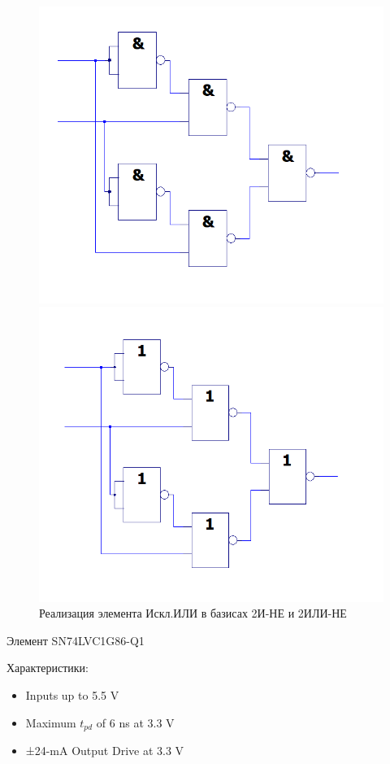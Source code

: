 \begin{figure}[H]
	\centering
	\begin{minipage}{.45\textwidth}
		\centering
		\includegraphics[width=0.85\linewidth]{imgs/1/xor_and}
	\end{minipage}
	\begin{minipage}{.45\textwidth}
		\centering
		\includegraphics[width=0.85\linewidth]{imgs/1/xor_or}
	\end{minipage}
	\caption{Реализация элемента Искл.ИЛИ в базисах 2И-НЕ и 2ИЛИ-НЕ}
\end{figure}


Элемент SN74LVC1G86-Q1

Характеристики:
\begin{itemize}
	\item Inputs up to 5.5 V
	\item Maximum $t_{pd}$ of 6 ns at 3.3 V
	\item ±24-mA Output Drive at 3.3 V
\end{itemize}